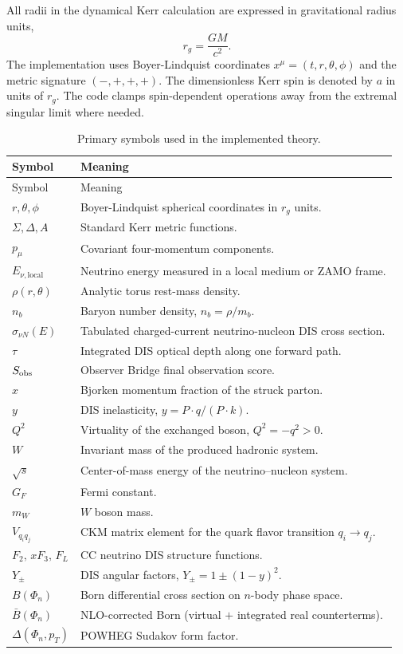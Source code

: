 \documentclass[11pt,a4paper]{report}
\numberwithin{equation}{chapter}
\newcommand{\rg}{r_g}
\newcommand{\sigmanun}{\sigma_{\nu N}}
\begin{document}
All radii in the dynamical Kerr calculation are expressed in gravitational
radius units,
\begin{equation}
\rg = \frac{G M}{c^2}.
\end{equation}
The implementation uses Boyer-Lindquist coordinates
$x^\mu=(t,r,\theta,\phi)$ and the metric signature $(-,+,+,+)$.
The dimensionless Kerr spin is denoted by $a$ in units of $\rg$.
The code clamps spin-dependent operations away from the extremal singular
limit where needed.

\begin{longtable}{>{\raggedright\arraybackslash}p{}
                  >{\raggedright\arraybackslash}p{}}
\caption{Primary symbols used in the implemented theory.}\\
\toprule
Symbol & Meaning \\
\midrule
\endfirsthead
\toprule
Symbol & Meaning \\
\midrule
\endhead
$r,\theta,\phi$ & Boyer-Lindquist spherical coordinates in $\rg$ units.\\
$\Sigma,\Delta,A$ & Standard Kerr metric functions.\\
$p_\mu$ & Covariant four-momentum components.\\
$E_{\nu,\mathrm{local}}$ & Neutrino energy measured in a local medium or ZAMO frame.\\
$\rho(r,\theta)$ & Analytic torus rest-mass density.\\
$n_b$ & Baryon number density, $n_b=\rho/m_b$.\\
$\sigmanun(E)$ & Tabulated charged-current neutrino-nucleon DIS cross section.\\
$\tau$ & Integrated DIS optical depth along one forward path.\\
$S_{\rm obs}$ & Observer Bridge final observation score.\\
$x$ & Bjorken momentum fraction of the struck parton.\\
$y$ & DIS inelasticity, $y=P\cdot q/(P\cdot k)$.\\
$Q^2$ & Virtuality of the exchanged boson, $Q^2=-q^2>0$.\\
$W$ & Invariant mass of the produced hadronic system.\\
$\sqrt{s}$ & Center-of-mass energy of the neutrino--nucleon system.\\
$G_F$ & Fermi constant.\\
$m_W$ & $W$ boson mass.\\
$V_{q_iq_j}$ & CKM matrix element for the quark flavor transition $q_i\to q_j$.\\
$F_2,\,xF_3,\,F_L$ & CC neutrino DIS structure functions.\\
$Y_\pm$ & DIS angular factors, $Y_\pm = 1\pm(1-y)^2$.\\
$B(\Phi_n)$ & Born differential cross section on $n$-body phase space.\\
$\bar{B}(\Phi_n)$ & NLO-corrected Born (virtual $+$ integrated real counterterms).\\
$\Delta(\Phi_n,p_T)$ & POWHEG Sudakov form factor.\\
\bottomrule
\end{longtable}
\end{document}
